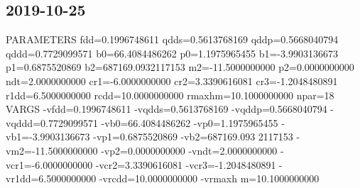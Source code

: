 \documentclass[11pt]{article}
\begin{document}
\subsection{2019-10-25}
\label{sec:org6c83311}
PARAMETERS
  fdd=0.1996748611 qdds=0.5613768169 qddp=0.5668040794 qddd=0.7729099571 b0=66.4084486262 p0=1.1975965455 b1=-3.9903136673 p1=0.6875520869 b2=687169.0932117153 m2=-11.5000000000 p2=0.0000000000 ndt=2.0000000000 cr1=-6.0000000000 cr2=3.3390616081 cr3=-1.2048480891 r1dd=6.5000000000 rcdd=10.0000000000 rmaxhm=10.1000000000 npar=18 
VARGS
    -vfdd=0.1996748611 -vqdds=0.5613768169 -vqddp=0.5668040794 -vqddd=0.7729099571 -vb0=66.4084486262 -vp0=1.1975965455 -vb1=-3.9903136673 -vp1=0.6875520869 -vb2=687169.093
2117153 -vm2=-11.5000000000 -vp2=0.0000000000 -vndt=2.0000000000 -vcr1=-6.0000000000 -vcr2=3.3390616081 -vcr3=-1.2048480891 -vr1dd=6.5000000000 -vrcdd=10.0000000000 -vrmaxh
m=10.1000000000 
\end{document}

